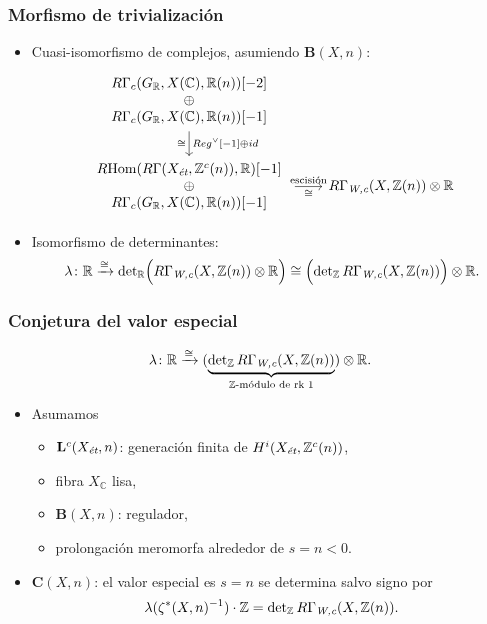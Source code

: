 \documentclass[handout]{beamer}
\newcommand{\CC}{\mathbb{C}}
\newcommand{\RR}{\mathbb{R}}
\newcommand{\ZZ}{\mathbb{Z}}
\DeclareMathOperator{\Hom}{Hom}
\newcommand{\et}{\text{\it ét}}
\newcommand{\Wc}{\text{\it W,c}}
\newcommand{\RHom}{R\!\Hom}
\begin{document}
\begin{frame}
  \frametitle{Morfismo de trivialización}

  \begin{itemize}
  \item Cuasi-isomorfismo de complejos, asumiendo $\mathbf{B} (X,n)$:
    \[ \begin{tikzcd}[column sep=4em,ampersand replacement=\&]
        \begin{array}{c} R\Gamma_c (G_\RR, X (\CC), \RR (n)) [-2] \\ \oplus \\ R\Gamma_c (G_\RR, X (\CC), \RR (n)) [-1] \end{array} \ar{d}{Reg^\vee [-1] \oplus id}[swap]{\cong} \\
        \begin{array}{c} \RHom (R\Gamma (X_\et, \ZZ^c (n)), \RR) [-1] \\ \oplus \\ R\Gamma_c (G_\RR, X (\CC), \RR (n)) [-1] \end{array} \ar{r}{\text{escisión}}[swap]{\cong} \&[-2em] R\Gamma_\Wc (X, \ZZ (n)) \otimes \RR
      \end{tikzcd} \]

  \item Isomorfismo de determinantes:
    \[ \lambda\colon \RR \xrightarrow{\cong}
      \det\nolimits_\RR \Bigl(R\Gamma_\Wc (X, \ZZ (n)) \otimes \RR\Bigr) \cong
      \Bigl(\det\nolimits_\ZZ R\Gamma_\Wc (X, \ZZ (n))\Bigr) \otimes \RR. \]
  \end{itemize}
\end{frame}


\begin{frame}
  \frametitle{Conjetura del valor especial}

  \[ \lambda\colon \RR \xrightarrow{\cong}
    (\underbrace{\det\nolimits_\ZZ R\Gamma_\Wc (X, \ZZ (n))}_{\ZZ\text{-módulo de rk }1}) \otimes \RR. \]

  \begin{itemize}
  \item Asumamos
    \begin{itemize}
    \item $\mathbf{L}^c (X_\et, n)$: generación finita de $H^i (X_\et, \ZZ^c(n))$,
    \item fibra $X_\CC$ lisa,
    \item $\mathbf{B} (X,n)$: regulador,
    \item prolongación meromorfa alrededor de $s = n < 0$.
    \end{itemize}

  \item $\mathbf{C} (X,n)$: el valor especial es $s = n$ se determina salvo
    signo por
    \[ \lambda (\zeta^* (X,n)^{-1})\cdot \ZZ =
      \det\nolimits_\ZZ R\Gamma_\Wc (X, \ZZ (n)). \]
  \end{itemize}
\end{frame}
\end{document}
